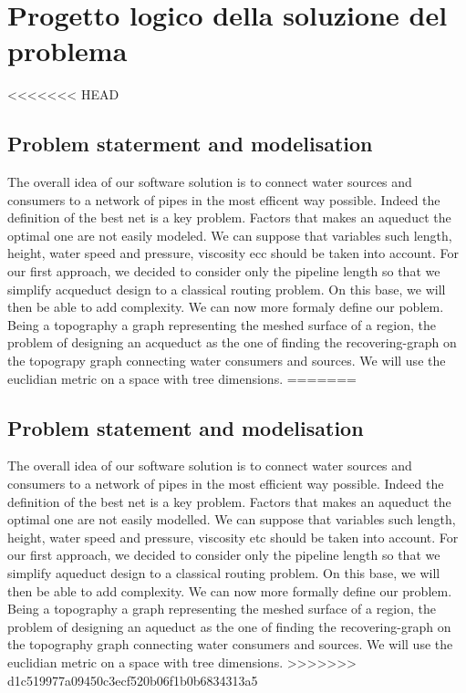 \chapter{Progetto logico della soluzione del problema}
\label{capitolo4}
\thispagestyle{empty}

<<<<<<< HEAD
\section{Problem staterment and modelisation}
The overall idea of our software solution is to connect water sources and consumers to a network of 
pipes in the most efficent way possible. Indeed the definition of the best net is a key problem. 
Factors that makes an aqueduct the optimal one are not easily modeled. We can suppose that variables 
such length, height, water speed and pressure, viscosity ecc should be taken into account.
\hfill For our first approach, we decided to consider only the pipeline length so that we simplify 
acqueduct design to a classical routing problem. On this base, we will then be able to add complexity.
\hfill We can now more formaly define our poblem. Being a topography a graph representing the meshed 
surface of a region, the problem of designing an acqueduct as the one of finding the recovering-graph 
on the topograpy graph connecting water consumers and sources. We will use the euclidian metric on a 
space with tree dimensions.
=======
\section {Problem statement and modelisation}
The overall idea of our software solution is to connect water sources and consumers to a network of pipes in the most efficient way possible. Indeed the definition of the best net is a key problem. Factors that makes an aqueduct the optimal one are not easily modelled. We can suppose that variables such length, height, water speed and pressure, viscosity etc should be taken into account.
\hfill For our first approach, we decided to consider only the pipeline length so that we simplify aqueduct design to a classical routing problem. On this base, we will then be able to add complexity.
\hfill We can now more formally define our problem. Being a topography a graph representing the meshed surface of a region, the problem of designing an aqueduct as the one of finding the recovering-graph on the topography graph connecting water consumers and sources. We will use the euclidian metric on a space with tree dimensions.
>>>>>>> d1c519977a09450c3ecf520b06f1b0b6834313a5


